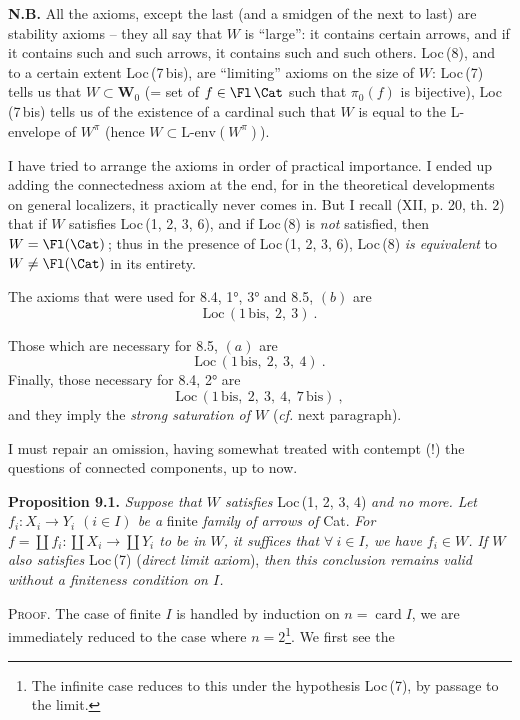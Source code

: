 \textbf{N.B.} All the axioms, except the last (and a smidgen of the next to last) are stability axioms – they all say that $W$ is ``large'': it contains certain arrows, and if it contains such and such arrows, it contains such and such others. Loc\,(8), and to a certain extent Loc\,(7\,bis), are ``limiting'' axioms on the size of $W$: Loc\,(7) tells us that $W\subset\mathbf{W}_0$ (= set %
of $f\in\Fl\,\Cat$ such that $\pi_0(f)$ is bijective), Loc\,(7\,bis) tells us of the existence of a cardinal such that $W$ is equal to the L-envelope of $W^\pi$ (hence $W\subset\text{L-env}(W^\pi)$).

I have tried to arrange the axioms in order of practical importance. I ended up adding the connectedness axiom at the end, for in the theoretical developments on general localizers, %
it practically never comes in. But I recall (XII, p. 20, th. 2) that if $W$ satisfies Loc\,(1, 2, 3, 6), and if Loc\,(8) is \textit{not} satisfied, then $W=\Fl(\Cat)$\,; thus in the presence of Loc\,(1, 2, 3, 6), Loc\,(8) \textit{is equivalent} to $W\neq\Fl(\Cat)$ in its entirety.


The axioms that were used for 8.4, 1°, 3° and 8.5, $(b)$ are
\[
\mathrm{Loc}\,(1\,\mathrm{bis},\ 2,\ 3)\ .
\]


Those which are necessary for 8.5, $(a)$ are
\[
\mathrm{Loc}\,(1\,\mathrm{bis},\ 2,\ 3,\ 4)\ .
\]
Finally, those necessary for 8.4, 2° are
\[
\mathrm{Loc}\,(1\,\mathrm{bis},\ 2,\ 3,\ 4,\ 7\,\mathrm{bis})\ ,
\]
and they imply the \textit{strong saturation of $W$} (\textit{cf.} next paragraph).

I must repair an omission, having somewhat treated with contempt (!) the questions of connected components, up to now.

\textbf{Proposition 9.1.} \textit{Suppose that $W$ satisfies} Loc\,(1, 2, 3, 4) \textit{and no more. Let $f_i : X_i\longrightarrow Y_i$ $(i\in I)$ be a} finite \textit{family of arrows of} Cat. \textit{For $f=\coprod f_i : \coprod X_i\longrightarrow\coprod Y_i$ to be in $W$, it suffices that $\forall\ i\in I$, we have $f_i\in W$. If $W$ also satisfies} Loc\,(7) (\textit{direct limit axiom}), \textit{then this conclusion remains valid without a finiteness condition on $I$.}

\textsc{Proof}. The case of finite $I$ is handled by induction on $n=\operatorname{card}I$, we are immediately reduced to the case where $n=2$\footnote[46]{The infinite case reduces to this under the hypothesis Loc\,(7), by passage to the limit.}. We first see the


